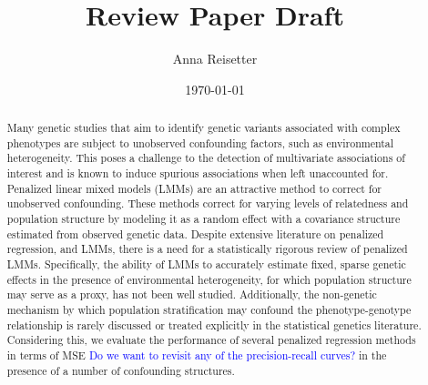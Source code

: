 \documentclass[a4paper]{article}
\title{Review Paper Draft}
\author{Anna Reisetter}
\date{\today}
\providecommand{\anna}[1]{\textcolor{blue}{#1}}
\begin{document}
\maketitle

\begin{abstract}
Many genetic studies that aim to identify genetic variants associated with complex phenotypes are subject to unobserved confounding factors, such as environmental heterogeneity. This poses a challenge to the detection of multivariate associations of interest and is known to induce spurious associations when left unaccounted for. Penalized linear mixed models (LMMs) are an attractive method to correct for unobserved confounding. These methods correct for varying levels of relatedness and population structure by modeling it as a random effect with a covariance structure estimated from observed genetic data. Despite extensive literature on penalized regression, and LMMs, there is a need for a statistically rigorous review of penalized LMMs. Specifically, the ability of LMMs to accurately estimate fixed, sparse genetic effects in the presence of environmental heterogeneity, for which population structure may serve as a proxy, has not been well studied. Additionally, the non-genetic mechanism by which population stratification may confound the phenotype-genotype relationship is rarely discussed or treated explicitly in the statistical genetics literature. Considering this, we evaluate the performance of several penalized regression methods in terms of MSE \anna{Do we want to revisit any of the precision-recall curves?} in the presence of a number of confounding structures.
\end{abstract}



\newpage



\end{document}
